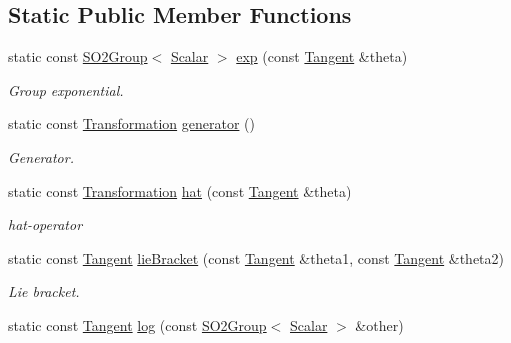 \subsection*{Static Public Member Functions}
\begin{DoxyCompactItemize}
\item 
static const \hyperlink{class_sophus_1_1_s_o2_group}{S\+O2\+Group}$<$ \hyperlink{class_sophus_1_1_s_o2_group_base_a075b701502715aecf0bdb3464963d36c}{Scalar} $>$ \hyperlink{class_sophus_1_1_s_o2_group_base_ab2f306cce273dddb1dff74bc4156e0a8}{exp} (const \hyperlink{class_sophus_1_1_s_o2_group_base_a3701d07bf2791675518a0ceb33ce653b}{Tangent} \&theta)
\begin{DoxyCompactList}\small\item\em Group exponential. \end{DoxyCompactList}\item 
static const \hyperlink{class_sophus_1_1_s_o2_group_base_a8981dccaf65802191e989815046b6a82}{Transformation} \hyperlink{class_sophus_1_1_s_o2_group_base_ac843066964e2fd31ad1fa7fe07d6f256}{generator} ()
\begin{DoxyCompactList}\small\item\em Generator. \end{DoxyCompactList}\item 
static const \hyperlink{class_sophus_1_1_s_o2_group_base_a8981dccaf65802191e989815046b6a82}{Transformation} \hyperlink{class_sophus_1_1_s_o2_group_base_a9f87c5799f00e799f8087f786389cb13}{hat} (const \hyperlink{class_sophus_1_1_s_o2_group_base_a3701d07bf2791675518a0ceb33ce653b}{Tangent} \&theta)
\begin{DoxyCompactList}\small\item\em hat-\/operator \end{DoxyCompactList}\item 
static const \hyperlink{class_sophus_1_1_s_o2_group_base_a3701d07bf2791675518a0ceb33ce653b}{Tangent} \hyperlink{class_sophus_1_1_s_o2_group_base_a009f4077e6fc4db7e0e4e011e084ff12}{lie\+Bracket} (const \hyperlink{class_sophus_1_1_s_o2_group_base_a3701d07bf2791675518a0ceb33ce653b}{Tangent} \&theta1, const \hyperlink{class_sophus_1_1_s_o2_group_base_a3701d07bf2791675518a0ceb33ce653b}{Tangent} \&theta2)
\begin{DoxyCompactList}\small\item\em Lie bracket. \end{DoxyCompactList}\item 
static const \hyperlink{class_sophus_1_1_s_o2_group_base_a3701d07bf2791675518a0ceb33ce653b}{Tangent} \hyperlink{class_sophus_1_1_s_o2_group_base_a5a64721b7036cd64c6d64a1880b111e3}{log} (const \hyperlink{class_sophus_1_1_s_o2_group}{S\+O2\+Group}$<$ \hyperlink{class_sophus_1_1_s_o2_group_base_a075b701502715aecf0bdb3464963d36c}{Scalar} $>$ \&other)

\end{DoxyCompactItemize}
